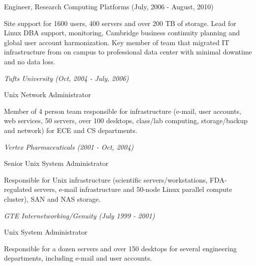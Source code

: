 \documentclass[11pt,article,oneside]{memoir}
\begin{document}
\ind \footnotesize Engineer, Research Computing Platforms (July, 2006 - August, 2010)

\ind \hspace{0.35in} \footnotesize Site support for 1600 users, 400 servers and over 200 TB of storage. Lead for Linux DBA support, monitoring, Cambridge business continuity planning and global user account harmonization. Key member of team that migrated IT infrastructure from on campus to professional data center with minimal downtime and no data loss.

\vspace{-0.075in}

\normalsize

\bigskip
\noindent\emph{Tufts University (Oct, 2004 - July, 2006) \vspace{0.05in}}

\ind \footnotesize Unix Network Administrator

\ind \hspace{0.35in} \footnotesize Member of 4 person team responsible for infrastructure (e-mail, user accounts, web services, 50 servers, over 100 desktops, class/lab computing, storage/backup and network) for ECE and CS departments.

\vspace{-0.075in}

\normalsize

\bigskip
\noindent\emph{Vertex Pharmaceuticals (2001 - Oct, 2004) \vspace{0.05in}}

\ind \footnotesize Senior Unix System Administrator

\ind \hspace{0.35in} \footnotesize Responsible for Unix infrastructure (scientific servers/workstations, FDA-regulated servers, e-mail infrastructure and 50-node Linux parallel compute cluster), SAN and NAS storage.

\vspace{-0.075in}

\normalsize

\bigskip
\noindent\emph{GTE Internetworking/Genuity (July 1999 - 2001)}

\ind \footnotesize Unix System Administrator

\ind \hspace{0.35in} \footnotesize Responsible for a dozen servers and over 150 desktops for several engineering departments, including e-mail and user accounts.

\vspace{-0.075in}
\end{document}
